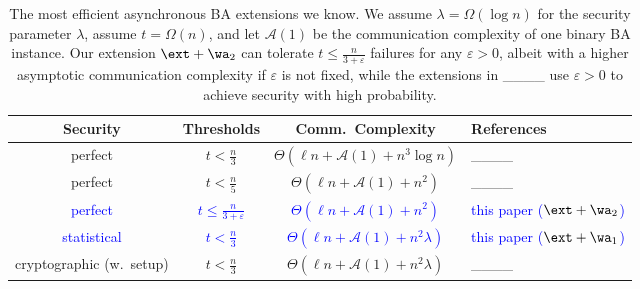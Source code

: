 \begin{table}[t] \begin{threeparttable}
    \setcellgapes{1pt}
    \caption{The most efficient asynchronous BA extensions we know. We assume $\lambda = \Omega(\log n)$ for the security parameter $\lambda$, assume $t = \Omega(n)$, and let $\mathcal{A}(1)$ be the communication complexity of one binary BA instance. Our \linebreak extension $\ext + \wa_2$ can tolerate $t \leq \frac{n}{3 + \varepsilon}$ failures for any $\varepsilon > 0$, albeit with a higher asymptotic communication complexity if $\varepsilon$ is not fixed, while the extensions in ____ use $\varepsilon > 0$ to achieve security with high probability.}
    \makegapedcells
    \begin{tabularx}{1\linewidth}{|c|c|c|Y|} \hline
        \textbf{Security} & \textbf{Thresholds} & \textbf{Comm.\ Complexity} & \textbf{References} \\ \hline
        
        perfect & $t < \frac{n}{3}$ & $\Theta(\ell n + \mathcal{A}(1) + n^3\log n)$ & ____ \\ \hline
        
        perfect & $t < \frac{n}{5}$ & $\Theta(\ell n + \mathcal{A}(1) + n^2)$ & ____ \\ \hline 
        
        \textcolor{blue}{perfect} & \textcolor{blue}{$t \leq \frac{n}{3 + \varepsilon}$} & \textcolor{blue}{$\Theta(\ell n + \mathcal{A}(1) + n^2)$} & \textcolor{blue}{this paper ($\ext + \wa_2$)} \\ \hline
        
        \textcolor{blue}{statistical} & \textcolor{blue}{$t < \frac{n}{3}$} & \textcolor{blue}{$\Theta(\ell n + \mathcal{A}(1) + n^2\lambda)$} & \textcolor{blue}{this paper ($\ext + \wa_1$)} \\ \hline
        
        cryptographic (w.\ setup) & $t < \frac{n}{3}$ & $\Theta(\ell n + \mathcal{A}(1) + n^2\lambda)$ & ____ \\ \hline
        

\end{tabularx}
\end{threeparttable}
\end{table}
